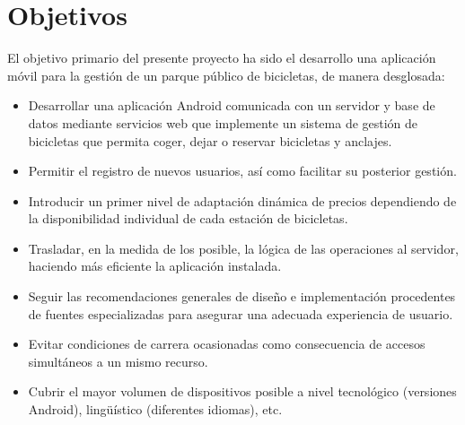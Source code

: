\chapter{Objetivos}

El objetivo primario del presente proyecto ha sido el desarrollo una aplicación móvil para la gestión de un parque público de bicicletas, de manera desglosada:

\begin{itemize}  
	\item Desarrollar una aplicación Android comunicada con un servidor y base de datos mediante servicios web que implemente un sistema de gestión de bicicletas que permita coger, dejar o reservar bicicletas y anclajes.
	\item Permitir el registro de nuevos usuarios, así como facilitar su posterior gestión.
	\item Introducir un primer nivel de adaptación dinámica de precios dependiendo de la disponibilidad individual de cada estación de bicicletas.
	\item Trasladar, en la medida de los posible, la lógica de las operaciones al servidor, haciendo más eficiente la aplicación instalada.
	\item Seguir las recomendaciones generales de diseño e implementación procedentes de fuentes especializadas para asegurar una adecuada experiencia de usuario.
	\item Evitar condiciones de carrera ocasionadas como consecuencia de accesos simultáneos a un mismo recurso.
	\item Cubrir el mayor volumen de dispositivos posible a nivel tecnológico (versiones Android), lingüístico (diferentes idiomas), etc.
\end{itemize}